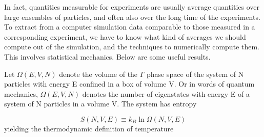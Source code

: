 \documentclass[letterpaper,12pt]{article}
\numberwithin{equation}{section}
\begin{document}
In fact, quantities measurable for experiments are usually average quantities over large ensembles of particles, and often also over the long time of the experiments. To extract from a computer simulation data comparable to those measured in a corresponding experiment, we have to know what kind of averages we should compute out of the simulation, and the techniques to numerically compute them. This involves statistical mechanics. Below are some useful results.

Let $\Omega(E, V, N)$ denote the volume of the $\Gamma$ phase space of the system of N particles with energy E confined in a box of volume V. Or in words of quantum mechanics, $\Omega(E, V, N)$ denotes the number of eigenstates with energy E of a system of N particles in a volume V. The system has entropy 

\begin{equation}
    S(N, V, E)\equiv k_B\ln\Omega(N,V,E)
\end{equation}
yielding the thermodynamic definition of temperature
\end{document}
